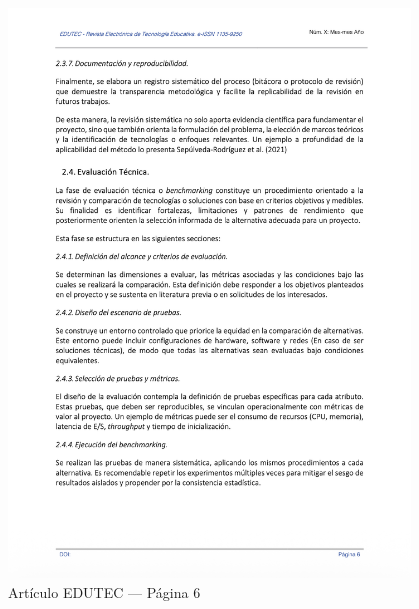 \begin{figure}[H]
    \centering
    \begin{tcolorbox}[
        colback=white,
        colframe=gray!50,
        boxrule=1pt,
        arc=2pt,
        boxsep=5pt,
        left=3pt,
        right=3pt,
        top=3pt,
        bottom=3pt,
        drop shadow
    ]
        \includegraphics[width=0.95\textwidth,keepaspectratio]{apendices/EDUTEC/6.png}
    \end{tcolorbox}
    \caption{Artículo EDUTEC --- Página 6}\label{fig:edutec-pagina-6}
\end{figure}
\FloatBarrier

